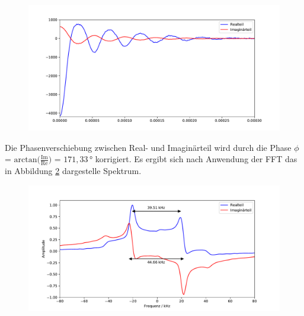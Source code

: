 \begin{figure}[H]
    \centering
    \includegraphics[width=\textwidth]{Auswertung/Spek/FID.pdf}
    \caption{}
    \label{fig:fid}
\end{figure}
\noindent
Die Phasenverschiebung zwischen Real- und Imaginärteil wird durch die Phase $\phi$ =
$\text{arctan}\biggl(\frac{\text{Im}}{\text{Re}}\biggr)$ = $171,33\,°$ korrigiert.
Es ergibt sich nach Anwendung der FFT das in Abbildung \ref{fig:spekt} dargestelle
Spektrum.

\begin{figure}[H]
    \centering
    \includegraphics[width=\textwidth]{Auswertung/Spek/Spek.pdf}
    \caption{}
    \label{fig:spekt}
\end{figure}
